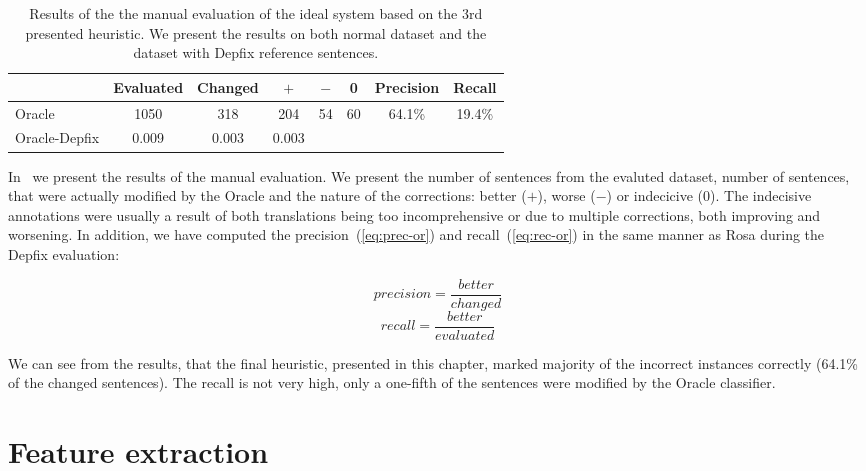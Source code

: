 \begin{table*}[t]
\centering
\small

\begin{tabular}{l|cc|ccc|cc}
  &  Evaluated  &  Changed  &  $+$  &  $-$  &  0  &  Precision  &  Recall  \\
\hline
Oracle  &  1050  &  318  &  204  &  54  &  60  &  64.1\%  &  19.4\%  \\
Oracle-Depfix  & 0.009  &  0.003  &  0.003  &  &  &  &  \\
\end{tabular}
\caption{
Results of the the manual evaluation of the ideal system based on the 3rd
presented heuristic. We present the results on both normal dataset and
the
dataset with Depfix reference sentences.
}
\label{oracle-maneval}
\end{table*}

In~ we present the results of the manual evaluation.
We present the number of sentences from the evaluted dataset, number of sentences,
that were actually modified by the Oracle and the nature of the corrections:
better ($+$), worse ($-$) or indecicive (0).
The indecisive annotations were usually a result of both translations being
too incomprehensive or due to multiple corrections, both improving and worsening.
In addition, we have computed the precision~(\ref{eq:prec-or}) and recall~(\ref{eq:rec-or}) in the same manner as Rosa during the Depfix evaluation:

\begin{equation} \label{eq:prec-or}
precision = \frac{better}{changed}
\end{equation}
\begin{equation} \label{eq:rec-or}
recall = \frac{better}{evaluated}
\end{equation}

We can see from the results, that the final heuristic, presented in this chapter,
marked majority of the incorrect instances correctly (64.1\% of the changed sentences).
The recall is not very high, only a one-fifth of the sentences were modified
by the Oracle classifier.



\section{Feature extraction}
\label{sec:feat_extract}



